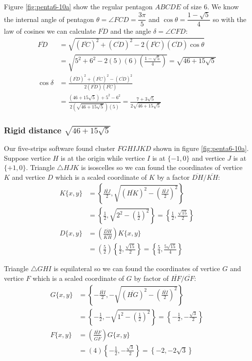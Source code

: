\documentclass[11pt]{article}
\begin{document}
Figure \ref{fig:penta6-10a} show the regular pentagon $ABCDE$ of size $6$. We know the internal angle of pentagon $\theta=\angle{FCD} =\dfrac{3\pi}5$ and $\cos\theta=\dfrac{1-\sqrt5}4$ so with the law of cosines we can calculate $\overline{FD}$ and the angle $\delta = \angle{CFD}$:
\begin{align}
\overline{FD} &= \sqrt{(\overline{FC})^2 + (\overline{CD})^2
 - 2(\overline{FC})(\overline{CD})\cos\theta} \nonumber\\
 &= \sqrt{5^2 + 6^2 - 2(5)(6)\left(\frac{1-\sqrt5}4\right)} = \sqrt{46 + 15\sqrt5}\\
%
\cos\delta &= \frac{(\overline{FD})^2 + (\overline{FC})^2 - (\overline{CD})^2}
 {2(\overline{FD})(\overline{FC})} \nonumber\\
 &= \frac{\left(46 + 15\sqrt5\right) + 5^2 - 6^2}
  {2\left(\sqrt{46 + 15\sqrt5}\right)(5)}
  = \frac{7 + 3\sqrt5}{2\sqrt{46 + 15\sqrt5}}
\end{align}

\subsubsection{Rigid distance $\sqrt{46 + 15\sqrt5}$}

Our five-strips software found cluster $FGHIJKD$ shown in figure \ref{fig:penta6-10a}. Suppose vertice $H$ is at the origin while vertice $I$ is at $\{-1,0\}$ and vertice $J$ is at $\{+1,0\}$. Triangle $\triangle{HJK}$ is isoscelles so we can found the coordinates of vertice $K$ and vertice $D$ which is a scaled coordinate of $K$ by a factor $\overline{DH} / \overline{KH}$:
\begin{align}
K\{x,y\} &= \left\{\frac{\overline{HJ}}2, 
 \sqrt{(\overline{HK})^2 - \left(\frac{\overline{HJ}}2\right)^2}\right\} \nonumber\\
 &= \left\{\frac{1}2, \sqrt{2^2 - \left(\frac{1}2\right)^2}\right\} 
 = \left\{\frac{1}2,\frac{\sqrt{15}}2\right\} \\
%
D\{x,y\} &= \left(\frac{\overline{DH}}{\overline{KH}}\right)K\{x,y\} \nonumber\\
 &= \left(\frac{5}2\right)\left\{\frac{1}2,\frac{\sqrt{15}}2\right\}
 = \left\{ \frac{5}4 , \frac{5\sqrt{15}}4 \right\}
\end{align}

Triangle $\triangle{GHI}$ is equilateral so we can found the coordinates of vertice $G$ and vertice $F$ which is a scaled coordinate of $G$ by factor of $\overline{HF} / \overline{GF}$:
\begin{align}
G\{x,y\} &= \left\{ -\frac{\overline{HI}}2, 
 - \sqrt{(\overline{HG})^2 - \left( \frac{\overline{HI}}2 \right)^2}\right\} \nonumber\\
 &= \left\{ -\frac{1}2, -\sqrt{1^2 - \left(\frac{1}2\right)^2} \right\}
 = \left\{ -\frac{1}2, -\frac{\sqrt3}2 \right\} \\
%
F\{x,y\} &= \left(\frac{\overline{HF}}{\overline{GF}}\right)G\{x,y\} \nonumber\\
 &= \left(4\right)\left\{ -\frac{1}2, -\frac{\sqrt3}2 \right\}
 = \left\{ -2, -2\sqrt{3} \right\}
\end{align}
\end{document}
